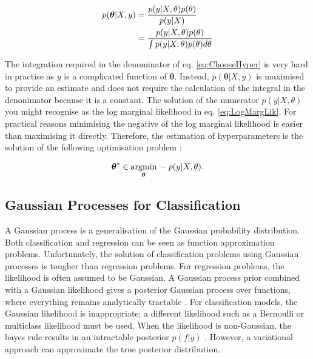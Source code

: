 \documentclass[12pt,a4paper]{report}
\theoremstyle{definition}
\begin{document}
\begin{equation}
	\label{eq:ChooseHyper}
	\begin{aligned}
		\centering
		p(\boldsymbol{\theta} | X, y) &= \frac{p(y | X, \theta) p(\theta)}{p(y | X)} \\
		&= \frac{p(y | X, \theta) p(\theta)}{\int p(y | X, \theta) p(\theta) d\theta} 
	\end{aligned}
\end{equation}

The integration required in the denominator of eq. \ref{eq:ChooseHyper} is very hard in practise as $y$ is a complicated function of $\boldsymbol{\theta}$. 
Instead, $p(\boldsymbol{\theta} | X, y)$ is maximised to provide an estimate and does not require the calculation of the integral in the denonimator because it is a constant.
The solution of the numerator $p(y | X, \theta)$ you might recognise as the log marginal likelihood in eq. \ref{eq:LogMargLik}. 
For practical reasons minimising the negative of the log marginal likelihood is easier than maximising it directly.
Therefore, the estimation of hyperparameters is the solution of the following optimisation problem \citep{Kaiser2017}:

\begin{equation}
	\centering
	\boldsymbol{\theta}^* \in \underset{\boldsymbol{\theta}}{\textrm{argmin}} \, -p(y | X, \theta).
\end{equation}

\subsection{Gaussian Processes for Classification}

A Gaussian process is a generalisation of the Gaussian probability distribution. 
Both classification and regression can be seen as function approximation problems. 
Unfortunately, the solution of classification problems using Gaussian processes is tougher than regression problems. 
For regression problems, the likelihood is often assumed to be Gaussian. 
A Gaussian process prior combined with a Gaussian likelihood gives a posterior Gaussian process over functions, where everything remains analytically tractable \citep{RasmussenWilliams2006}. 
For classification models, the Gaussian likelihood is inappropriate; a different likelihood such as a Bernoulli or multiclass likelihood must be used.
When the likelihood is non-Gaussian, the bayes rule results in an intractable posterior $p(f|y)$ \citep{Yi2020}.
However, a variational approach can approximate the true posterior distribution.
\end{document}
